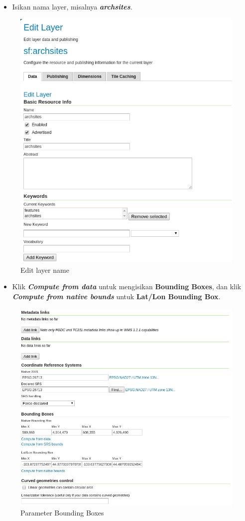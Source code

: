 \documentclass[]{book}
\providecommand{\tightlist}{%
  \setlength{\itemsep}{0pt}\setlength{\parskip}{0pt}}
\begin{document}
\begin{itemize}
\tightlist
\item
  Isikan nama layer, misalnya \textbf{\emph{archsites}}.
\end{itemize}

\begin{figure}

{\centering \includegraphics[width=0.6\linewidth]{images/08/gs17a} 

}

\caption{Edit layer name}\label{fig:gs17a}
\end{figure}

\begin{itemize}
\tightlist
\item
  Klik \textbf{\emph{Compute from data}} untuk mengisikan \textbf{Bounding Boxes}, dan klik \textbf{\emph{Compute from native bounds}} untuk \textbf{Lat/Lon Bounding Box}.
\end{itemize}

\begin{figure}

{\centering \includegraphics[width=0.6\linewidth]{images/08/gs17b} 

}

\caption{Parameter Bounding Boxes}\label{fig:gs17b}
\end{figure}
\end{document}
